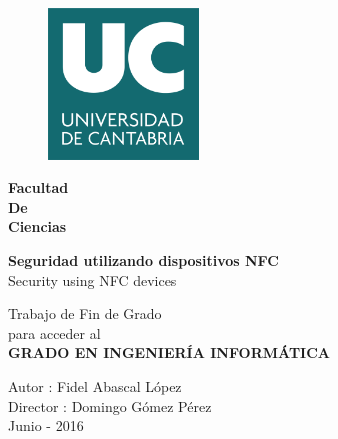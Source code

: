 \documentclass[a4paper,12pt, twoside, openright,makeidx]{book}
\title{\titulo}
\author{\autor}
\newcommand{\titulo}{Seguridad utilizando dispositivos NFC}
\newcommand{\tituloIngles}{Security using NFC devices}
\newcommand{\autor}{Fidel Abascal López}
\newcommand{\director}{Domingo Gómez Pérez}
\newcommand{\carrera}{GRADO EN INGENIERÍA INFORMÁTICA}
\newcommand{\fecha}{Junio - 2016}
\begin{document}
\begin{titlepage}

\begin{center}
\vspace*{-1in}
\begin{figure}[htb]
\begin{center}
\includegraphics[width=4cm]{./img/unicanLogo}
\end{center}
\end{figure}

\begin{LARGE}
\textbf{
Facultad \\
De\\
Ciencias\\}
\end{LARGE}
\vspace*{1in}
\begin{huge}
\textbf{\titulo} \\
\tituloIngles \\
\end{huge}
\vspace*{0.6in}
\begin{large}
Trabajo de Fin de Grado\\
para acceder al\\
\vspace*{0.15in}
\textbf{\carrera}\\
\end{large}
\vspace*{0.8in}

\begin{large}
\begin{flushright}
Autor : \autor\\
Director : \director\\
\fecha
\end{flushright}
\end{large}

\end{center}

\end{titlepage}
\begingroup
\let\cleardoublepage\clearpage
\tableofcontents{}
\endgroup
\end{document}
